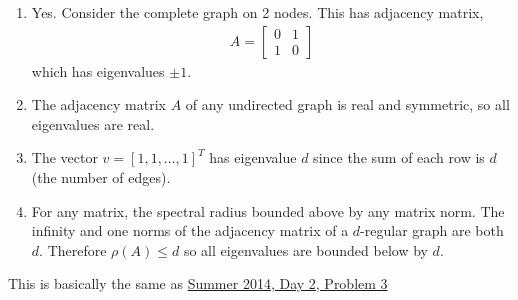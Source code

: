 \documentclass[10pt]{article}
\begin{document}
\begin{solution}[Solution]
\begin{enumerate}[label=(\alph*)]
    \item Yes. Consider the complete graph on 2 nodes. This has adjacency matrix,
        \begin{align*}
            A = \left[\begin{array}{cc}0 & 1 \\ 1& 0\end{array}\right]
        \end{align*}
        which has eigenvalues \( \pm 1 \).
        
    \item The adjacency matrix \( A \) of any undirected graph is real and symmetric, so all eigenvalues are real. 
    \item The vector \( v=[1,1,\ldots, 1]^T \) has eigenvalue \( d \) since the sum of each row is \( d \) (the number of edges).
    \item For any matrix, the spectral radius bounded above by any matrix norm. The infinity and one norms of the adjacency matrix of a \( d \)-regular graph are both \( d \). Therefore \( \rho(A) \leq d \) so all eigenvalues are bounded below by \( d \). 
\end{enumerate}
    
\end{solution}



\begin{problem}
This is basically the same as \hyperref[Summer 2014, Day 2, Problem 3]{Summer 2014, Day 2, Problem 3}
\end{problem}

\begin{solution}[Solution]
    
\end{solution}
\end{document}

